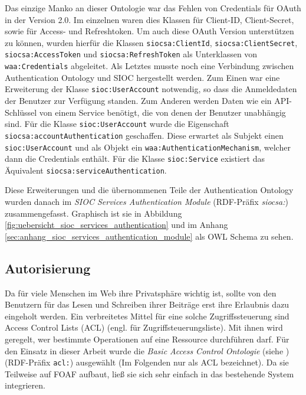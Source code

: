Das einzige Manko an dieser Ontologie war das Fehlen von Credentials für OAuth in der Version 2.0. Im einzelnen waren dies Klassen für Client-ID, Client-Secret, sowie für Access- und Refreshtoken. Um auch diese OAuth Version unterstützen zu können, wurden hierfür die Klassen \texttt{siocsa:ClientId}, \texttt{siocsa:ClientSecret}, \texttt{siocsa:AccessToken} und \texttt{siocsa:RefreshToken} als Unterklassen von \texttt{waa:Credentials} abgeleitet. Als Letztes musste noch eine Verbindung zwischen Authentication Ontology und SIOC hergestellt werden. Zum Einen war eine Erweiterung der Klasse \texttt{sioc:UserAccount} notwendig, so dass die Anmeldedaten der Benutzer zur Verfügung standen. Zum Anderen werden Daten wie ein API-Schlüssel von einem Service benötigt, die von denen der Benutzer unabhängig sind. Für die Klasse \texttt{sioc:UserAccount} wurde die Eigenschaft \texttt{siocsa:accountAuthentication} geschaffen. Diese erwartet als Subjekt einen \texttt{sioc:UserAccount} und als Objekt ein \texttt{waa:AuthenticationMechanism}, welcher dann die Credentials enthält. Für die Klasse \texttt{sioc:Service} existiert das Äquivalent \texttt{siocsa:serviceAuthentication}. 

Diese Erweiterungen und die übernommenen Teile der Authentication Ontology wurden danach im \emph{SIOC Services Authentication Module} (RDF-Präfix \emph{siocsa:}) zusammengefasst. Graphisch ist sie in Abbildung \ref{fig:uebersicht_sioc_services_authentication} und im Anhang \ref{sec:anhang_sioc_services_authentication_module} als OWL Schema zu sehen. 


\subsection{Autorisierung} %
\label{sub:autorisierung}

Da für viele Menschen im Web ihre Privatsphäre wichtig ist, sollte von den Benutzern für das Lesen und Schreiben ihrer Beiträge erst ihre Erlaubnis dazu eingeholt werden. Ein verbreitetes Mittel für eine solche Zugriffssteuerung sind Access Control Lists (ACL) (engl. für Zugriffsteuerungsliste). Mit ihnen wird geregelt, wer bestimmte Operationen auf eine Ressource durchführen darf. Für den Einsatz in dieser Arbeit wurde die \emph{Basic Access Control Ontologie} (siehe \cite{Hollenbach2009,wiki:wacl})(RDF-Präfix \texttt{acl:}) ausgewählt (Im Folgenden nur als ACL bezeichnet). Da sie Teilweise auf FOAF aufbaut, ließ sie sich sehr einfach in das bestehende System integrieren.

